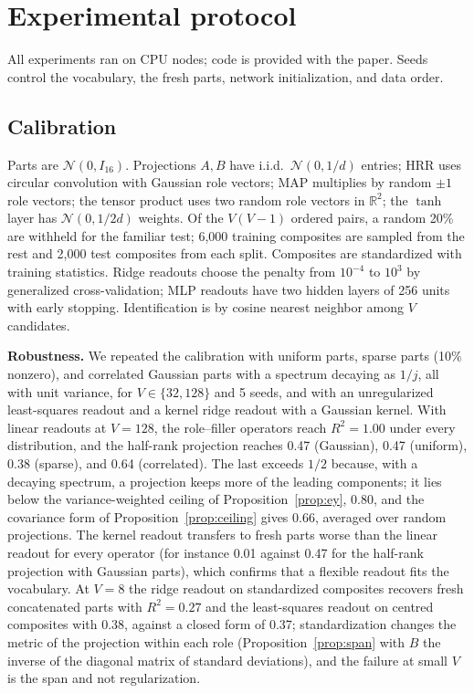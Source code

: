\documentclass[10pt]{article}
\theoremstyle{plain}
\theoremstyle{remark}
\newcommand{\R}{\mathbb{R}}
\begin{document}
\section{Experimental protocol}
\label{app:protocol}

All experiments ran on CPU nodes; code is provided with the paper. Seeds control the vocabulary, the fresh parts, network initialization, and data order.

\subsection{Calibration}
Parts are $\mathcal{N}(0, I_{16})$. Projections $A, B$ have i.i.d.\ $\mathcal{N}(0, 1/d)$ entries; HRR uses circular convolution with Gaussian role vectors; MAP multiplies by random $\pm 1$ role vectors; the tensor product uses two random role vectors in $\R^2$; the $\tanh$ layer has $\mathcal{N}(0, 1/2d)$ weights. Of the $V(V-1)$ ordered pairs, a random 20\% are withheld for the familiar test; 6{,}000 training composites are sampled from the rest and 2{,}000 test composites from each split. Composites are standardized with training statistics. Ridge readouts choose the penalty from $10^{-4}$ to $10^{3}$ by generalized cross-validation; MLP readouts have two hidden layers of 256 units with early stopping. Identification is by cosine nearest neighbor among $V$ candidates.

\textbf{Robustness.} We repeated the calibration with uniform parts, sparse parts (10\% nonzero), and correlated Gaussian parts with a spectrum decaying as $1/j$, all with unit variance, for $V \in \{32, 128\}$ and 5 seeds, and with an unregularized least-squares readout and a kernel ridge readout with a Gaussian kernel. With linear readouts at $V = 128$, the role--filler operators reach $R^2 = 1.00$ under every distribution, and the half-rank projection reaches 0.47 (Gaussian), 0.47 (uniform), 0.38 (sparse), and 0.64 (correlated). The last exceeds $1/2$ because, with a decaying spectrum, a projection keeps more of the leading components; it lies below the variance-weighted ceiling of Proposition~\ref{prop:ey}, 0.80, and the covariance form of Proposition~\ref{prop:ceiling} gives 0.66, averaged over random projections. The kernel readout transfers to fresh parts worse than the linear readout for every operator (for instance 0.01 against 0.47 for the half-rank projection with Gaussian parts), which confirms that a flexible readout fits the vocabulary. At $V = 8$ the ridge readout on standardized composites recovers fresh concatenated parts with $R^2 = 0.27$ and the least-squares readout on centred composites with 0.38, against a closed form of 0.37; standardization changes the metric of the projection within each role (Proposition~\ref{prop:span} with $B$ the inverse of the diagonal matrix of standard deviations), and the failure at small $V$ is the span and not regularization.
\end{document}
